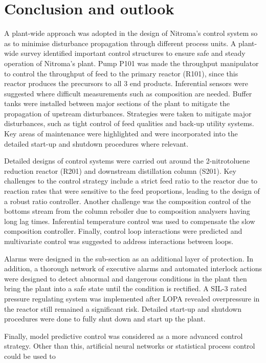 \section{Conclusion and outlook}
A plant-wide approach was adopted in the design of Nitroma's control system so as to minimise disturbance propagation through different process units. A plant-wide survey identified important control structures to ensure safe and steady operation of Nitroma's plant. Pump P101 was made the throughput manipulator to control the throughput of feed to the primary reactor (R101), since this reactor produces the precursors to all 3 end products. Inferential sensors were suggested where difficult measurements such as composition are needed. Buffer tanks were installed between major sections of the plant to mitigate the propagation of upstream disturbances. Strategies were taken to mitigate major disturbances, such as tight control of feed qualities and back-up utility systems. Key areas of maintenance were highlighted and were incorporated into the detailed start-up and shutdown procedures where relevant.

Detailed designs of control systems were carried out around the 2-nitrotoluene reduction reactor (R201) and downstream distillation column (S201). Key challenges to the control strategy include a strict feed ratio to the reactor due to reaction rates that were sensitive to the feed proportions, leading to the design of a robust ratio controller. Another challenge was the composition control of the bottoms stream from the column reboiler due to composition analysers having long lag times. Inferential temperature control was used to compensate the slow composition controller. Finally, control loop interactions were predicted and multivariate control was suggested to address interactions between loops.  

Alarms were designed in the sub-section as an additional layer of protection. In addition, a thorough network of executive alarms and automated interlock actions were designed to detect abnormal and dangerous conditions in the plant then bring the plant into a safe state until the condition is rectified. A SIL-3 rated pressure regulating system was implemented after LOPA revealed overpressure in the reactor still remained a significant risk. Detailed start-up and shutdown procedures were done to fully shut down and start up the plant.

Finally, model predictive control was considered as a more advanced control strategy. Other than this, artificial neural networks or statistical process control could be used to 